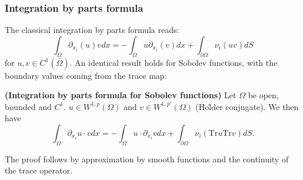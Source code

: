 \subsubsection{Integration by parts formula}
The classical integration by parts formula reads: $$\int_{\Omega} \partial_{x_i}(u) v dx=-\int_{\Omega}u\partial_{x_i}(v)dx +\int_{\partial\Omega} \nu_i (uv) dS $$ for $u,v\in C^1(\overline\Omega)$. An identical result holds for Sobolev functions, with the boundary values coming from the trace map: 
\begin{theorem}
    \textbf{(Integration by parts formula for Sobolev functions)} Let $\Omega$ be open, bounded and $C^1$. $u\in W^{1,p}(\Omega)$ and $v\in W^{1,p'}(\Omega)$ (Ho\"lder conjugate). We then have $$\int_{\Omega} \partial_{x_i}u \cdot v dx =-\int_{\Omega} u\cdot \partial_{x_i}v dx +\int_{\partial\Omega} \nu_i (\mathrm{Tr}u \mathrm{Tr}v)dS. $$
\end{theorem}
The proof follows by approximation by smooth functions and the continuity of the trace operator.